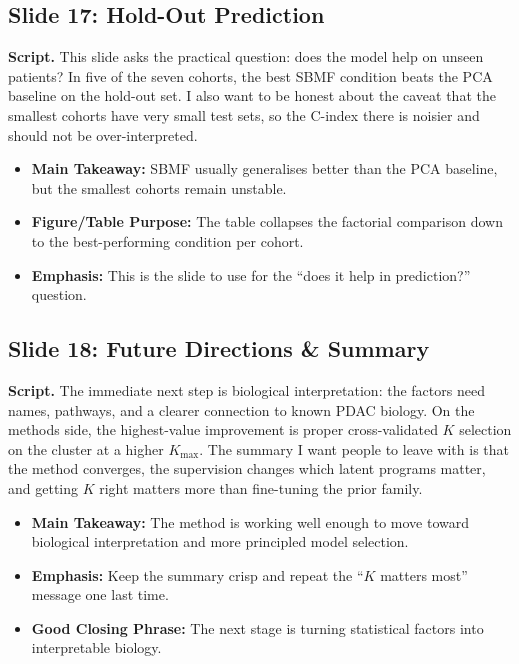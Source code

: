 \documentclass[11pt]{article}
\newcommand{\scriptlabel}{\textbf{Script. }}
\newcommand{\sectionlabel}[1]{\textbf{#1}}
\begin{document}
\subsection*{Slide 17: Hold-Out Prediction}
\scriptlabel This slide asks the practical question: does the model help on unseen patients? In five of the seven cohorts, the best SBMF condition beats the PCA baseline on the hold-out set. I also want to be honest about the caveat that the smallest cohorts have very small test sets, so the C-index there is noisier and should not be over-interpreted.

\begin{itemize}
\item \sectionlabel{Main Takeaway:} SBMF usually generalises better than the PCA baseline, but the smallest cohorts remain unstable.
\item \sectionlabel{Figure/Table Purpose:} The table collapses the factorial comparison down to the best-performing condition per cohort.
\item \sectionlabel{Emphasis:} This is the slide to use for the ``does it help in prediction?'' question.
\end{itemize}

\subsection*{Slide 18: Future Directions \& Summary}
\scriptlabel The immediate next step is biological interpretation: the factors need names, pathways, and a clearer connection to known PDAC biology. On the methods side, the highest-value improvement is proper cross-validated $K$ selection on the cluster at a higher $K_{\max}$. The summary I want people to leave with is that the method converges, the supervision changes which latent programs matter, and getting $K$ right matters more than fine-tuning the prior family.

\begin{itemize}
\item \sectionlabel{Main Takeaway:} The method is working well enough to move toward biological interpretation and more principled model selection.
\item \sectionlabel{Emphasis:} Keep the summary crisp and repeat the ``$K$ matters most'' message one last time.
\item \sectionlabel{Good Closing Phrase:} The next stage is turning statistical factors into interpretable biology.
\end{itemize}
\end{document}
